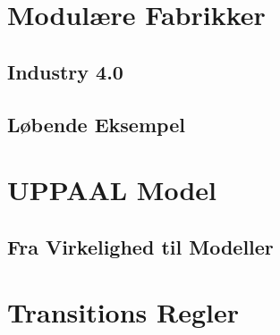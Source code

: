 \section{Modulære Fabrikker}

\subsection{Industry 4.0}
\subsection{Løbende Eksempel}


\section{UPPAAL Model}
\subsection{Fra Virkelighed til Modeller}

\section{Transitions Regler}
